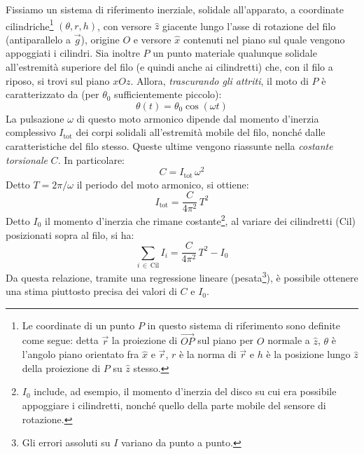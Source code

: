 \documentclass{article}
\begin{document}
Fissiamo un sistema di riferimento inerziale, solidale all'apparato,
a coordinate cilindriche\footnote{
    Le coordinate di un punto $P$ in questo sistema di riferimento sono
    definite come segue: detta $\vec{r}$ la proiezione di $\overrightarrow{OP}$
    sul piano per $O$ normale a $\hat{z}$,
    $\theta$ è l'angolo piano orientato fra $\hat{x}$ e $\vec{r}$,
    $r$ è la norma di $\vec{r}$ e
    $h$ è la posizione lungo $\hat{z}$ della proiezione di $P$ su
    $\hat{z}$ stesso.
} $(\theta, r, h)$, con versore $\hat{z}$ giacente
lungo l'asse di rotazione del filo (antiparallelo a $\vec{g}$),
origine $O$ e versore $\hat{x}$ contenuti nel piano sul quale vengono appoggiati
i cilindri. Sia inoltre $P$ un punto materiale qualunque solidale all'estremità
superiore del filo (e quindi anche ai cilindretti) che, con il filo a riposo,
si trovi sul piano $xOz$.
Allora, \emph{trascurando gli attriti}, il moto di $P$ è caratterizzato da
(per $\theta_0$ sufficientemente piccolo):
\[\theta(t) = \theta_0 \cos(\omega t)\]
La pulsazione $\omega$ di questo moto armonico dipende dal momento d'inerzia
complessivo $I_\text{tot}$ dei corpi solidali all'estremità mobile del filo,
nonché dalle caratteristiche del filo stesso. Queste ultime vengono riassunte
nella \emph{costante torsionale} $C$. In particolare:
\[ C = I_\text{tot}\,\omega^2 \]
Detto $T = 2\pi / \omega$ il periodo del moto armonico, si ottiene:
\[ I_\text{tot} = \frac{C}{4\pi^2}\,T^2 \]
Detto $I_0$ il momento d'inerzia che rimane costante\footnote{
    $I_0$ include, ad esempio, il momento d'inerzia del disco su cui
    era possibile appoggiare i cilindretti, nonché quello della parte mobile
    del sensore di rotazione.
},
al variare dei cilindretti ($\text{Cil}$) posizionati sopra al filo, si ha:
\[ \sum_{i\,\in\,\text{Cil}}\!\!I_i = \frac{C}{4\pi^2}\,T^2 - I_0 \]
Da questa relazione, tramite una regressione lineare (pesata\footnote{
    Gli errori assoluti su $I$ variano da punto a punto.
}), è possibile
ottenere una stima piuttosto precisa dei valori di $C$ e $I_0$.
\end{document}
